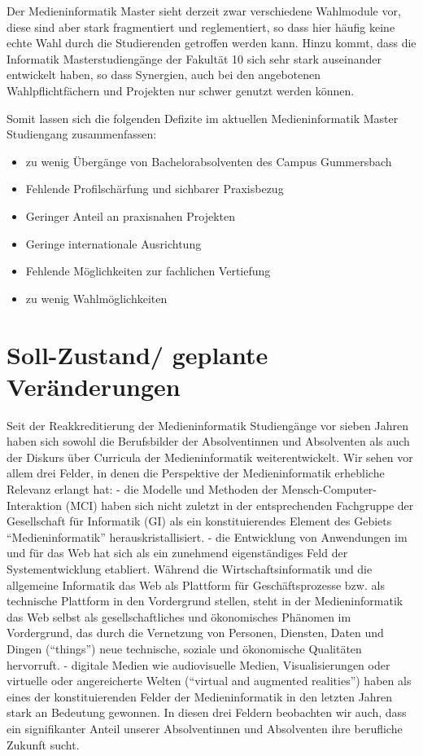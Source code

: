 Der Medieninformatik Master sieht derzeit zwar verschiedene Wahlmodule
vor, diese sind aber stark fragmentiert und reglementiert, so dass hier
häufig keine echte Wahl durch die Studierenden getroffen werden kann.
Hinzu kommt, dass die Informatik Masterstudiengänge der Fakultät 10 sich
sehr stark auseinander entwickelt haben, so dass Synergien, auch bei den
angebotenen Wahlpflichtfächern und Projekten nur schwer genutzt werden
können.

Somit lassen sich die folgenden Defizite im aktuellen Medieninformatik
Master Studiengang zusammenfassen:

\begin{itemize}
\tightlist
\item
  zu wenig Übergänge von Bachelorabsolventen des Campus Gummersbach
\item
  Fehlende Profilschärfung und sichbarer Praxisbezug
\item
  Geringer Anteil an praxisnahen Projekten
\item
  Geringe internationale Ausrichtung
\item
  Fehlende Möglichkeiten zur fachlichen Vertiefung
\item
  zu wenig Wahlmöglichkeiten
\end{itemize}

\chapter{Soll-Zustand/ geplante
Veränderungen}\label{soll-zustand-geplante-veruxe4nderungen}

Seit der Reakkreditierung der Medieninformatik Studiengänge vor sieben
Jahren haben sich sowohl die Berufsbilder der Absolventinnen und
Absolventen als auch der Diskurs über Curricula der Medieninformatik
weiterentwickelt. Wir sehen vor allem drei Felder, in denen die
Perspektive der Medieninformatik erhebliche Relevanz erlangt hat: - die
Modelle und Methoden der Mensch-Computer-Interaktion (MCI) haben sich
nicht zuletzt in der entsprechenden Fachgruppe der Gesellschaft für
Informatik (GI) als ein konstituierendes Element des Gebiets
``Medieninformatik'' herauskristallisiert. - die Entwicklung von
Anwendungen im und für das Web hat sich als ein zunehmend eigenständiges
Feld der Systementwicklung etabliert. Während die Wirtschaftsinformatik
und die allgemeine Informatik das Web als Plattform für
Geschäftsprozesse bzw. als technische Plattform in den Vordergrund
stellen, steht in der Medieninformatik das Web selbst als
gesellschaftliches und ökonomisches Phänomen im Vordergrund, das durch
die Vernetzung von Personen, Diensten, Daten und Dingen (``things'')
neue technische, soziale und ökonomische Qualitäten hervorruft. -
digitale Medien wie audiovisuelle Medien, Visualisierungen oder
virtuelle oder angereicherte Welten (``virtual and augmented
realities'') haben als eines der konstituierenden Felder der
Medieninformatik in den letzten Jahren stark an Bedeutung gewonnen. In
diesen drei Feldern beobachten wir auch, dass ein signifikanter Anteil
unserer Absolventinnen und Absolventen ihre berufliche Zukunft sucht.

